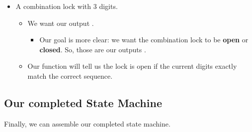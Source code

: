 \begin{itemize}
                \item A combination lock with 3 digits.
                    \begin{itemize}
                        \item We want our output . 
                            \begin{itemize}
                                \item Our goal is more clear: we want the combination lock to be \textbf{open} or \textbf{closed}. So, those are our outputs .
                            \end{itemize}
                            
                        \item Our function  will tell us the lock is open if the current digits exactly match the correct sequence.
                    \end{itemize}
            \end{itemize}
    
    \secdiv
    
    \subsection{Our completed State Machine}
    
        Finally, we can assemble our completed state machine.\\
        
